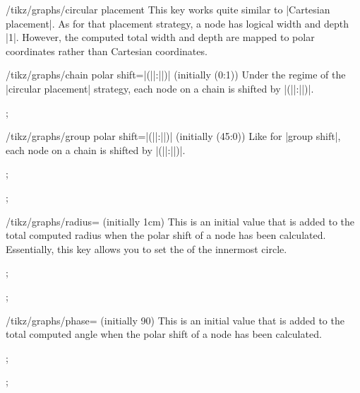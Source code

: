 \begin{key}{/tikz/graphs/circular placement}
  This key works quite similar to |Cartesian placement|. As for that
  placement strategy, a node has logical width and depth |1|. However,
  the computed total width and depth are mapped to polar coordinates
  rather than Cartesian coordinates.
  
  \begin{key}{/tikz/graphs/chain polar shift=|(||:||)| (initially {(0:1)})}
    Under the regime of the |circular placement| strategy, each node
    on a chain is shifted by |(||:||)|.
\begin{codeexample}[]
\tikz {};
\end{codeexample}
  \end{key}  
  \begin{key}{/tikz/graphs/group polar shift=|(||:||)| (initially {(45:0)})}
    Like for |group shift|, each node
    on a chain is shifted by |(||:||)|.
\begin{codeexample}[]
\tikz {};
\end{codeexample}
\begin{codeexample}[]
\tikz {};
\end{codeexample}
  \end{key}
  \begin{key}{/tikz/graphs/radius= (initially 1cm)}
    This is an initial value that is added to the total computed
    radius when the polar shift of a node has been
    calculated. Essentially, this key allows you to set the
     of the innermost circle.
\begin{codeexample}[]
\tikz {};
\end{codeexample}
\begin{codeexample}[]
\tikz {};
\end{codeexample}
  \end{key}
  \begin{key}{/tikz/graphs/phase= (initially 90)}
    This is an initial value that is added to the total computed
    angle when the polar shift of a node has been
    calculated. 
\begin{codeexample}[]
\tikz {};
\end{codeexample}
\begin{codeexample}[]
\tikz {};
\end{codeexample}
  \end{key}
\end{key}

